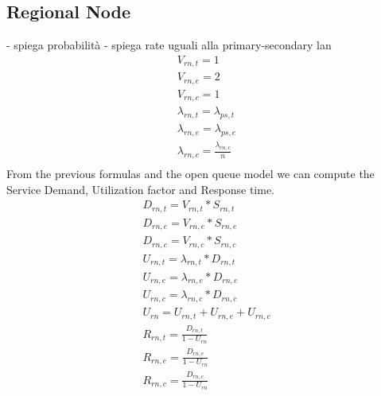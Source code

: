 \documentclass[11pt]{article}
\begin{document}
\subsection{Regional Node}
- spiega probabilità
- spiega rate uguali alla primary-secondary lan
\begin{equation}
	\begin{array}{l}
		V_{rn, t} = 1 \\
		V_{rn, e} = 2 \\ %
		V_{rn,c} = 1 \\
		\lambda_{rn, t} = \lambda_{ps, t} \\
		\lambda_{rn, e} = \lambda_{ps, e} \\
		\lambda_{rn, c} = \frac{\lambda_{cn, c}}{n} \\
	\end{array}
\end{equation}
From the previous formulas and the open queue model we can compute the Service Demand, Utilization factor and Response time.
\begin{equation}
	\begin{array}{l}
		D_{rn, t} = V_{rn, t} * S_{rn, t} \\
		D_{rn, e} = V_{rn, e} * S_{rn, e} \\
		D_{rn, c} = V_{rn, c} * S_{rn, c} \\
		U_{rn, t} = \lambda_{rn, t} * D_{rn, t} \\
		U_{rn, e} = \lambda_{rn, e} * D_{rn, e} \\
		U_{rn, c} = \lambda_{rn, c} * D_{rn, c} \\
		U_{rn} = U_{rn, t} + U_{rn, e} + U_{rn, c} \\
		R_{rn, t} = \frac{D_{rn, t}}{1 - U_{rn}} \\
		R_{rn, e} = \frac{D_{rn, e}}{1 - U_{rn}} \\
		R_{rn, c} = \frac{D_{rn, c}}{1 - U_{rn}} \\
	\end{array}
\end{equation}
\end{document}
